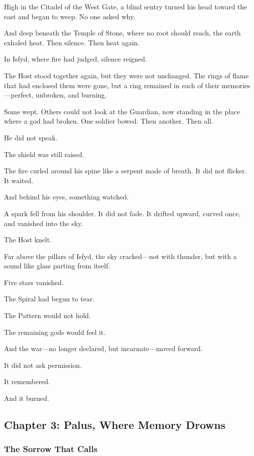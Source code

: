 \documentclass[12pt]{article}
\begin{document}
High in the Citadel of the West Gate, a blind sentry turned his head toward the east and began to weep. No one asked why.

And deep beneath the Temple of Stone, where no root should reach, the earth exhaled heat. Then silence. Then heat again.

In Isfyd, where fire had judged, silence reigned.

The Host stood together again, but they were not unchanged. The rings of flame that had enclosed them were gone, but a ring remained in each of their memories—perfect, unbroken, and burning.

Some wept. Others could not look at the Guardian, now standing in the place where a god had broken. One soldier bowed. Then another. Then all.

He did not speak.

The shield was still raised.

The fire curled around his spine like a serpent made of breath. It did not flicker. It waited.

And behind his eyes, something watched.

A spark fell from his shoulder. It did not fade. It drifted upward, curved once, and vanished into the sky.

The Host knelt.

Far above the pillars of Isfyd, the sky cracked—not with thunder, but with a sound like glass parting from itself.

Five stars vanished.

The Spiral had begun to tear.

The Pattern would not hold.

The remaining gods would feel it.

And the war—no longer declared, but incarnate—moved forward.

It did not ask permission.

It remembered.

And it burned.

\newpage

\subsection*{Chapter 3: Palus, Where Memory Drowns}

\vspace{.5in}

\subsubsection*{The Sorrow That Calls}
\end{document}
